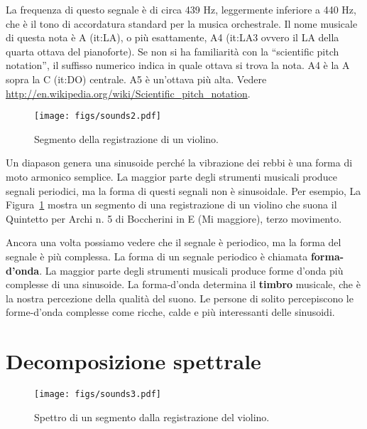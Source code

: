 \documentclass[12pt,a4paper]{book}
\begin{document}
La frequenza di questo segnale è di circa 439 Hz, leggermente inferiore a 440 Hz, che è il tono di accordatura standard per la musica orchestrale. Il nome musicale di questa nota è A (it:LA), o più esattamente, A4 (it:LA3 ovvero il LA della quarta ottava del pianoforte). Se non si ha familiarità con la ``scientific pitch notation'', il suffisso numerico indica in quale ottava si trova la nota. A4 è la A sopra la C (it:DO) centrale. A5 è un'ottava più alta. Vedere \url{http://en.wikipedia.org/wiki/Scientific_pitch_notation}.

\begin{figure} 

\centerline{\texttt{[image: figs/sounds2.pdf]}} \caption{Segmento della registrazione di un violino.} \label{fig.sounds2} \end{figure} 

Un diapason genera una sinusoide perché la vibrazione dei rebbi è una forma di moto armonico semplice. La maggior parte degli strumenti musicali produce segnali periodici, ma la forma di questi segnali non è sinusoidale. Per esempio, La Figura~\ref{fig.sounds2} mostra un segmento di una registrazione di un violino che suona il Quintetto per Archi n. 5 di Boccherini in E (Mi maggiore), terzo movimento.

Ancora una volta possiamo vedere che il segnale è periodico, ma la forma del segnale è più complessa. La forma di un segnale periodico è chiamata {\bf forma-d'onda}. La maggior parte degli strumenti musicali produce forme d'onda più complesse di una sinusoide. La forma-d'onda determina il {\bf timbro} musicale, che è la nostra percezione della qualità del suono. Le persone di solito percepiscono le forme-d'onda complesse come ricche, calde e più interessanti delle sinusoidi.

\section{Decomposizione spettrale} 

\begin{figure} 

\centerline{\texttt{[image: figs/sounds3.pdf]}} \caption{Spettro di un segmento dalla registrazione del violino.} \label{fig.sounds3} \end{figure} 
\end{document}
